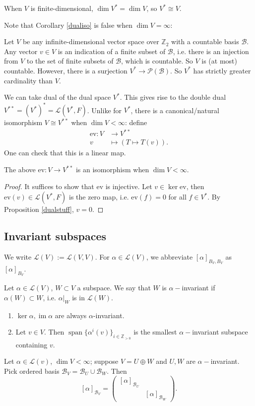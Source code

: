 \documentclass{scrartcl}
\def\Z{\mathbb{Z}}
\def\L{\mathcal{L}}
\def\B{\mathcal{B}}
\DeclareMathOperator{\im}{im}
\DeclareMathOperator{\spn}{span}  %
\begin{document}
\begin{corollary} \label{dualiso}
	When $V$ is finite-dimensional, $\dim V^* = \dim V$, so $V^* \cong V$. 
\end{corollary}
Note that Corollary \ref{dualiso} is false when $\dim V = \infty$: 
\begin{example}
	Let $V$ be any infinite-dimensional vector space over $\Z_2$ with a countable basis $\B$. Any vector $v \in V$ is an indication of a finite subset of $\B$, i.e. there is an injection from $V$ to the set of finite subsets of $\B$, which is countable. So $V$ is (at most) countable. However, there is a surjection $V^* \to \mathcal{P}(\B)$. So $V^*$ has strictly greater cardinality than $V$. 
\end{example}
We can take dual of the dual space $V^*$. This gives rise to the double dual $V^{**} = (V^*)^* = \L(V^*, F)$. Unlike for $V^*$, there is a canonical/natural isomorphism $V \cong V^{**}$ when $\dim{V}<\infty$: define 
\begin{align*}
	\text{ev}: V &\to V^{**} \\
	v &\mapsto (T \mapsto T(v)).
\end{align*}
One can check that this is a linear map. 
\begin{proposition}
	The above $\text{ev}: V \to V^{**}$ is an isomorphism when $\dim V < \infty$. 
\end{proposition}
\begin{proof}
	It suffices to show that $\text{ev}$ is injective. Let $v \in \ker{\text{ev}}$, then $\text{ev}(v) \in \L(V^*, F)$ is the zero map, i.e. $\text{ev}(f)=0$ for all $f \in V^*$. By Proposition \ref{dualstuff}, $v = 0$. 
\end{proof}
\subsection{Invariant subspaces}
We write $\L(V) := \L(V, V)$. For $\alpha \in \L(V)$, we abbreviate $[\alpha]_{B_V, B_V}$ as $[\alpha]_{B_V}$. 
\begin{definition}
	Let $\alpha \in \L(V)$, $W \subset V$ a subspace. We say that $W$ is $\alpha-$invariant if $\alpha(W) \subset W$, i.e. $\alpha\vert_W$ is in $\L(W)$. 
\end{definition}
\begin{example}
	\begin{enumerate}
		\item $\ker{\alpha}, \im{\alpha}$ are always $\alpha$-invariant.
		\item Let $v \in V$. Then $\spn\{\alpha^i(v)\}_{i \in \Z_{>0}}$ is the smallest $\alpha-$invariant subspace containing $v$. 
	\end{enumerate}
\end{example}
\begin{lemma}
	Let $\alpha \in \L(v)$, $\dim V < \infty$; suppose $V = U\oplus W$ and $U, W$ are $\alpha-$invariant. Pick ordered basis $\B_V = \B_U \cup \B_W$. Then
	\[[\alpha]_{\B_V} = \begin{pmatrix}
		[\alpha]_{\B_U} & \\
		& [\alpha]_{\B_W}
	\end{pmatrix}.\]
\end{lemma}
\end{document}
